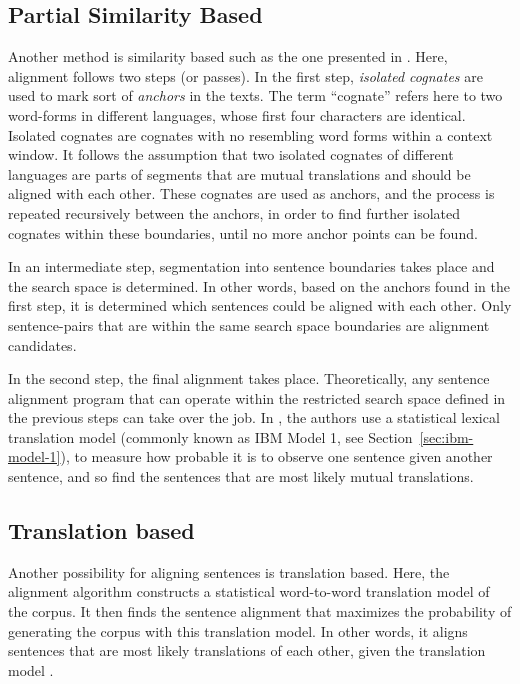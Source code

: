 \subsection{Partial Similarity Based}
Another method is similarity based such as the one presented in \cite{simard-plamondon-1996-bilingual}. 
Here, alignment follows two steps (or passes). 
In the first step, \emph{isolated cognates} are used to mark sort of \emph{anchors} in the texts. 
The term \enquote{cognate} refers here to two word-forms in different languages, whose  first four characters are identical. 
Isolated cognates are cognates with no resembling word forms within a context window.
It follows the assumption that two isolated cognates of different languages are parts of segments that are mutual translations and should be aligned with each other. 
These cognates are used as anchors, and the process is repeated recursively between the anchors, in order to find further isolated cognates within these boundaries, until no more anchor points can be found.

In an intermediate step, segmentation into sentence boundaries takes place and the search space is determined. 
In other words, based on the anchors found in the first step, it is determined which sentences could be aligned with each other. 
Only sentence-pairs that are within the same search space boundaries are alignment candidates.

In the second step, the final alignment takes place. 
Theoretically, any sentence alignment program that can operate within the restricted search space defined in the previous steps can take over the job. 
In \cite{simard-plamondon-1996-bilingual}, the authors use a statistical lexical translation model (commonly known as IBM Model 1, see Section~\ref{sec:ibm-model-1}), to measure how probable it is to observe one sentence given another sentence, and so find the sentences that are most likely mutual translations.

\subsection{Translation based}

Another possibility for aligning sentences is translation based. 
Here, the alignment algorithm constructs a statistical word-to-word translation model of the corpus. 
It then finds the sentence alignment that maximizes the probability of generating the corpus with this translation model. 
In other words, it aligns sentences that are most likely translations of each other, given the translation model \autocite{chen-1993-aligning}. 

